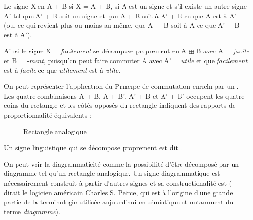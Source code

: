 {Le signe X  en A + B si X = A + B, si A est un signe et s’il existe un autre signe A’ tel que A’ + B soit un signe et que A + B soit à A’ + B ce que A est à A’ (ou, ce qui revient plus ou moins au même, que A~+ B soit à A ce que A’ + B est à A’).}

Ainsi le signe X = \textit{facilement} se décompose proprement en A ${\boxplus}$ B avec A = \textit{facile} et B = \textit{{}-ment}, puisqu’on peut faire commuter A avec A’ = \textit{utile} et que \textit{facilement} est à \textit{facile} ce que \textit{utilement} est à \textit{utile}.

On peut représenter l’application du Principe de commutation enrichi par un . Les quatre combinaisons A + B, A + B’, A’ + B et A’ + B’ occupent les quatre coins du rectangle et les côtés opposés du rectangle indiquent des rapports de proportionnalité équivalents :

\begin{figure}
\caption{Rectangle analogique}
\end{figure}


{Un signe linguistique qui se décompose proprement est dit .}

On peut voir la {diagrammaticité} comme la possibilité d’être décomposé par un diagramme tel qu’un rectangle analogique. Un signe diagrammatique est nécessairement construit à partir d’autres signes et sa constructionalité est  ( dirait le logicien américain Charles S. Peirce, qui est à l’origine d’une grande partie de la terminologie utilisée aujourd’hui en sémiotique et notamment du terme \textit{diagramme}).

